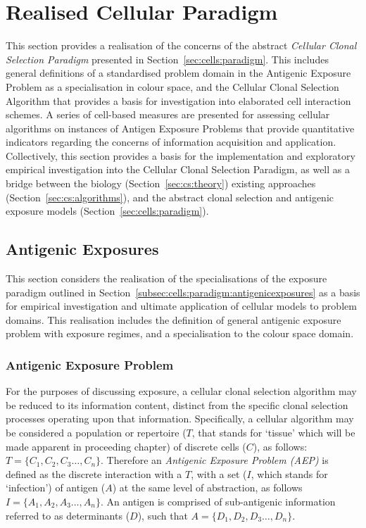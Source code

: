 %
%
\section{Realised Cellular Paradigm}
\label{sec:cells:realised}
This section provides a realisation of the concerns of the abstract \emph{Cellular Clonal Selection Paradigm} presented in Section~\ref{sec:cells:paradigm}. This includes general definitions of a standardised problem domain in the Antigenic Exposure Problem as a specialisation in colour space, and the Cellular Clonal Selection Algorithm that provides a basis for investigation into elaborated cell interaction schemes. A series of cell-based measures are presented for assessing cellular algorithms on instances of Antigen Exposure Problems that provide quantitative indicators regarding the concerns of information acquisition and application. Collectively, this section provides a basis for the implementation and exploratory empirical investigation into the Cellular Clonal Selection Paradigm, as well as a bridge between the biology (Section~\ref{sec:cs:theory}) existing approaches (Section~\ref{sec:cs:algorithms}), and the abstract clonal selection and antigenic exposure models (Section~\ref{sec:cells:paradigm}).


%
%
\subsection{Antigenic Exposures}
\label{sec:cells:realised:exposures}
This section considers the realisation of the specialisations of the exposure paradigm outlined in Section~\ref{subsec:cells:paradigm:antigenicexposures} as a basis for empirical investigation and ultimate application of cellular models to problem domains. This realisation includes the definition of general antigenic exposure problem with exposure regimes, and a specialisation to the colour space domain.

%
%
\subsubsection{Antigenic Exposure Problem}
For the purposes of discussing exposure, a cellular clonal selection algorithm may be reduced to its information content, distinct from the specific clonal selection processes operating upon that information. Specifically, a cellular algorithm may be considered a population or repertoire ($T$, that stands for `tissue' which will be made apparent in proceeding chapter) of discrete cells ($C$), as follows: $T = \{C_1, C_2, C_3 \ldots, C_n\}$. Therefore an \emph{Antigenic Exposure Problem (AEP)} is defined as the discrete interaction with a $T$, with a set ($I$, which stands for `infection') of antigen ($A$) at the same level of abstraction, as follows $I = \{A_1, A_2, A_3 \ldots, A_n\}$. An antigen is comprised of sub-antigenic information referred to as determinants ($D$), such that $A = \{D_1, D_2, D_3 \ldots, D_n\}$. 

